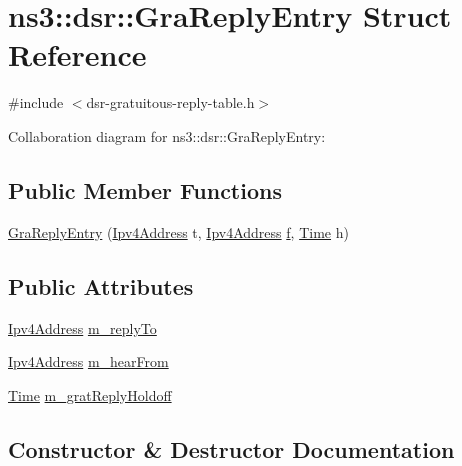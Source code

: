 \hypertarget{structns3_1_1dsr_1_1GraReplyEntry}{}\section{ns3\+:\+:dsr\+:\+:Gra\+Reply\+Entry Struct Reference}
\label{structns3_1_1dsr_1_1GraReplyEntry}


{\ttfamily \#include $<$dsr-\/gratuitous-\/reply-\/table.\+h$>$}



Collaboration diagram for ns3\+:\+:dsr\+:\+:Gra\+Reply\+Entry\+:
\subsection*{Public Member Functions}
\begin{DoxyCompactItemize}
\item 
\hyperlink{structns3_1_1dsr_1_1GraReplyEntry_a3bf3b0a3a45e7b0816a20685600a334a}{Gra\+Reply\+Entry} (\hyperlink{classns3_1_1Ipv4Address}{Ipv4\+Address} t, \hyperlink{classns3_1_1Ipv4Address}{Ipv4\+Address} \hyperlink{80211b_8c_ae7ffc1a8f84fa47a0812b2f2b9627132}{f}, \hyperlink{classns3_1_1Time}{Time} h)
\end{DoxyCompactItemize}
\subsection*{Public Attributes}
\begin{DoxyCompactItemize}
\item 
\hyperlink{classns3_1_1Ipv4Address}{Ipv4\+Address} \hyperlink{structns3_1_1dsr_1_1GraReplyEntry_a8c35d8cbe8774566a445f865e227e367}{m\+\_\+reply\+To}
\item 
\hyperlink{classns3_1_1Ipv4Address}{Ipv4\+Address} \hyperlink{structns3_1_1dsr_1_1GraReplyEntry_addd9ad57b844e1140bbebf5dc5370e71}{m\+\_\+hear\+From}
\item 
\hyperlink{classns3_1_1Time}{Time} \hyperlink{structns3_1_1dsr_1_1GraReplyEntry_a83a85d13ae24a81c6e2e1585b67a1b7c}{m\+\_\+grat\+Reply\+Holdoff}
\end{DoxyCompactItemize}


\subsection{Constructor \& Destructor Documentation}
